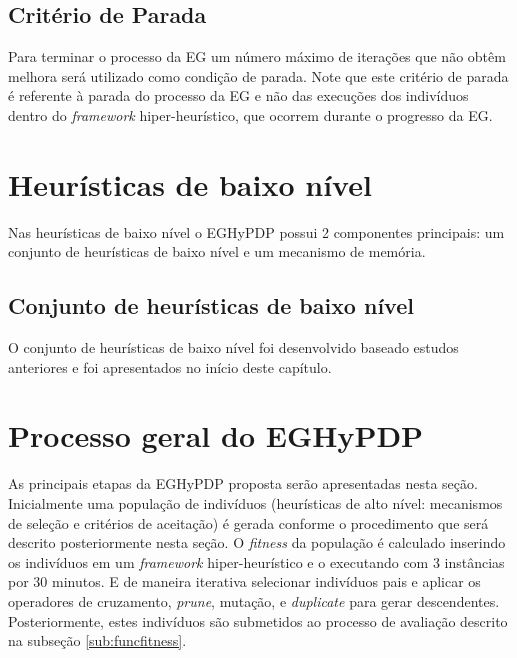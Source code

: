 % 
%
 
 
 
   


  
  \subsection{Critério de Parada}
  \label{sub:criterioParada}
  
  Para terminar o processo da EG um número máximo de iterações que não obtêm melhora será utilizado como condição de parada. Note que este critério de parada é referente à parada do processo da EG e não das execuções dos indivíduos dentro do \textit{framework} hiper-heurístico, que ocorrem durante o progresso da EG. 
  
  
  \section{Heurísticas de baixo nível}
  
  Nas heurísticas de baixo nível o EGHyPDP possui 2 componentes principais: um conjunto de heurísticas de baixo nível e um mecanismo de memória.
  
  \subsection{Conjunto de heurísticas de baixo nível}
  O conjunto de heurísticas de baixo nível foi desenvolvido baseado estudos anteriores e foi apresentados no início deste capítulo.
  



\section{Processo geral do EGHyPDP} 

As principais etapas da EGHyPDP proposta serão apresentadas nesta seção.
Inicialmente uma população de indivíduos (heurísticas de alto nível: mecanismos de seleção e critérios de aceitação) é gerada conforme o procedimento que será descrito posteriormente nesta seção. O \textit{fitness} da população é calculado inserindo os indivíduos em um \textit{framework} hiper-heurístico e o executando com 3 instâncias por 30 minutos. E de maneira iterativa selecionar indivíduos pais e aplicar os operadores de cruzamento, \textit{prune}, mutação, e \textit{duplicate} para gerar descendentes. Posteriormente, estes indivíduos são submetidos ao processo de avaliação descrito na subseção \ref{sub:funcfitness}.

